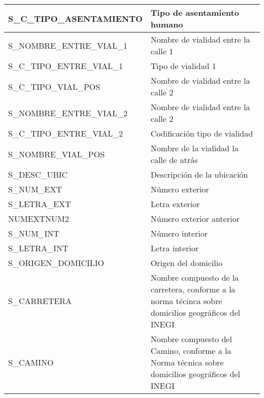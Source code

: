\begin{longtable}{|p{8cm}|p{8cm}|}
    \hline
    S\_C\_TIPO\_ASENTAMIENTO & Tipo de asentamiento humano \\
    \hline
    S\_NOMBRE\_ENTRE\_VIAL\_1 & Nombre de vialidad entre la calle 1 \\
    \hline
    S\_C\_TIPO\_ENTRE\_VIAL\_1 & Tipo de vialidad 1 \\
    \hline
    S\_C\_TIPO\_VIAL\_POS & Nombre de vialidad entre la calle 2 \\
    \hline
    S\_NOMBRE\_ENTRE\_VIAL\_2 & Nombre de vialidad entre la calle 2 \\
    \hline
    S\_C\_TIPO\_ENTRE\_VIAL\_2 & Codificación tipo de vialidad \\
    \hline
    S\_NOMBRE\_VIAL\_POS & Nombre de la vialidad la calle de atrás \\
    \hline
    S\_DESC\_UBIC & Descripción de la ubicación \\
    \hline
    S\_NUM\_EXT & Número exterior \\
    \hline
    S\_LETRA\_EXT & Letra exterior \\
    \hline
    NUMEXTNUM2 & Número exterior anterior \\
    \hline
    S\_NUM\_INT & Número interior \\
    \hline
    S\_LETRA\_INT & Letra interior \\
    \hline
    S\_ORIGEN\_DOMICILIO & Origen del domicilio \\
    \hline
    S\_CARRETERA & Nombre compuesto de la carretera, conforme a la norma técinca sobre domicilios geográficos del INEGI \\
    \hline
    S\_CAMINO & Nombre compuesto del Camino, conforme a la Norma técnica sobre domicilios geográficos del INEGI \\
    \hline
\end{longtable}
\label{tab:domicilios}
